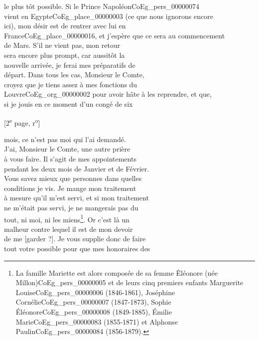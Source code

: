 \documentclass{book}
\begin{document}
le plus tôt possible. Si le Prince Napoléon\gls{CoEg_pers_00000074}\\
vient en Egypte\gls{CoEg_place_00000003} (ce que nous ignorons encore\\
ici), mon désir est de rentrer avec lui en\\
France\gls{CoEg_place_00000016}, et j’espère que ce sera au commencement\\
de Mars. S’il ne vient pas, mon retour\\
sera encore plus prompt, car aussitôt la\\
nouvelle arrivée, je ferai mes préparatifs de\\
départ. Dans tous les cas, Monsieur le Comte,\\
croyez que je tiens assez à mes fonctions du\\
Louvre\gls{CoEg_org_00000002} pour avoir hâte à les reprendre, et que,\\
si je jouis en ce moment d’un congé de six
{\footnotesize \begin{center} [2\textsuperscript{e} page, r\textsuperscript{o}]\end{center}}
\noindent mois, ce n’est pas moi qui l’ai demandé.\\
\indent J’ai, Monsieur le Comte, une autre prière\\
à vous faire. Il s’agit de mes appointements\\
pendant les deux mois de Janvier et de Février.\\
Vous savez mieux que personnes dans quelles\\
conditions je vis. Je mange mon traitement\\
à mesure qu’il m’est servi, et si mon traitement\\
ne m’était pas servi, je ne mangerais pas du\\
tout, ni moi, ni les miens\footnote{La famille Mariette est alors composée de sa femme Êléonore (née Millon)\gls{CoEg_pers_00000005} et de leurs cinq premiers enfants Marguerite Louise\gls{CoEg_pers_00000006} (1846-1861), Joséphine Cornélie\gls{CoEg_pers_00000007} (1847-1873), Sophie Éléonore\gls{CoEg_pers_00000008} (1849-1885), Émilie Marie\gls{CoEg_pers_00000083} (1855-1871) et Alphonse Paulin\gls{CoEg_pers_00000084} (1856-1879).}. Or c’est là un\\
malheur contre lequel il est de mon devoir\\
de me [garder ?]. Je vous supplie donc de faire\\
tout votre possible pour que mes honoraires des\\
\end{document}
